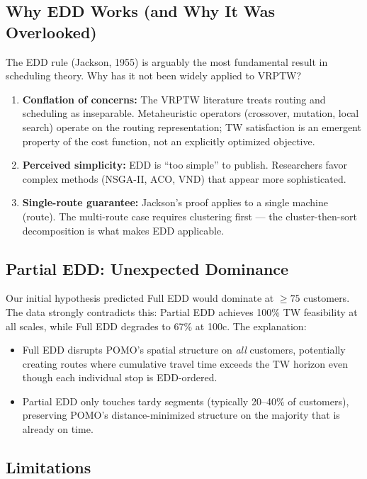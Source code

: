 \documentclass[11pt,a4paper]{article}
\begin{document}
\subsection{Why EDD Works (and Why It Was Overlooked)}

The EDD rule (Jackson, 1955) is arguably the most fundamental result in scheduling
theory. Why has it not been widely applied to VRPTW?

\begin{enumerate}[nosep]
    \item \textbf{Conflation of concerns:} The VRPTW literature treats routing and
    scheduling as inseparable. Metaheuristic operators (crossover, mutation, local
    search) operate on the routing representation; TW satisfaction is an emergent
    property of the cost function, not an explicitly optimized objective.
    \item \textbf{Perceived simplicity:} EDD is ``too simple'' to publish. Researchers
    favor complex methods (NSGA-II, ACO, VND) that appear more sophisticated.
    \item \textbf{Single-route guarantee:} Jackson's proof applies to a single
    machine (route). The multi-route case requires clustering first — the
    cluster-then-sort decomposition is what makes EDD applicable.
\end{enumerate}

\subsection{Partial EDD: Unexpected Dominance}

Our initial hypothesis predicted Full EDD would dominate at $\geq 75$ customers.
The data strongly contradicts this: Partial EDD achieves 100\% TW feasibility at
all scales, while Full EDD degrades to 67\% at 100c. The explanation:

\begin{itemize}[nosep]
    \item Full EDD disrupts POMO's spatial structure on \textit{all} customers,
    potentially creating routes where cumulative travel time exceeds the TW horizon
    even though each individual stop is EDD-ordered.
    \item Partial EDD only touches tardy segments (typically 20--40\% of customers),
    preserving POMO's distance-minimized structure on the majority that is already
    on time.
\end{itemize}

\subsection{Limitations}
\end{document}
